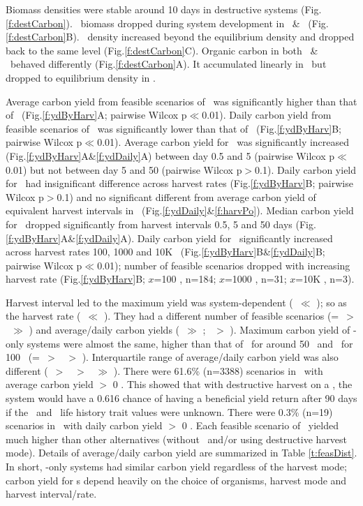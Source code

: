 \documentclass[../thesis.tex]{subfiles} %
\begin{document}
Biomass densities were stable around 10 days in destructive systems (Fig.\ref{f:destCarbon}).  \Phy\ biomass dropped during system development in \PoN\ \& \PBN\  (Fig.\ref{f:destCarbon}B).  \Bac\ density increased beyond the equilibrium density and dropped back to the same level (Fig.\ref{f:destCarbon}C).  Organic carbon in both \PoN\ \& \PBN\ behaved differently (Fig.\ref{f:destCarbon}A).  It accumulated linearly in \PoN\ but dropped to equilibrium density in \PBH.

Average carbon yield from feasible scenarios of \PoN\ was significantly higher than that of \PBN\ (Fig.\ref{f:ydByHarv}A; pairwise Wilcox p$\ll$0.01).  Daily carbon yield from feasible scenarios of \PoH\ was significantly lower than that of \PBH\ (Fig.\ref{f:ydByHarv}B; pairwise Wilcox p$\ll$0.01).  Average carbon yield for \PoN\ was significantly increased (Fig.\ref{f:ydByHarv}A\&\ref{f:ydDaily}A) between day 0.5 and 5 (pairwise Wilcox p$\ll$0.01) but not between day 5 and 50 (pairwise Wilcox p$>$0.1).  Daily carbon yield for \PoH\ had insignificant difference across harvest rates (Fig.\ref{f:ydByHarv}B; pairwise Wilcox p$>$0.1) and no significant different from average carbon yield of equivalent harvest intervals in \PoN\ (Fig.\ref{f:ydDaily}\&\ref{f:harvPo}).  Median carbon yield for \PBN\ dropped significantly from harvest intervals 0.5, 5 and 50 days (Fig.\ref{f:ydByHarv}A\&\ref{f:ydDaily}A).  Daily carbon yield for \PBH\ significantly increased across harvest rates 100, 1000 and 10K \dayU\ (Fig.\ref{f:ydByHarv}B\&\ref{f:ydDaily}B; pairwise Wilcox p$\ll$0.01); number of feasible scenarios dropped with increasing harvest rate (Fig.\ref{f:ydByHarv}B; $x$=100 \dayU, n=184; $x$=1000 \dayU, n=31; $x$=10K \dayU, n=3).

Harvest interval led to the maximum yield was system-dependent (\PBN\ $\ll$ \PoN); so as the harvest rate (\PBH\ $\ll$ \PoH).  They had a different number of feasible scenarios (\PoH=\PoN\ $>$ \PBN\ $\gg$ \PBH) and average/daily carbon yields (\PBH\ $\gg$ \PoH; \PoN\ $>$ \PBN).  Maximum carbon yield of \phy-only systems were almost the same, higher than that of \PBH\ for around 50 \dxdt\ and \PBN\ for 100 \dxdt\ (\PoH=\PoN\ $>$ \PBH\ $>$ \PBN).  Interquartile range of average/daily carbon yield was also different (\PBH\ $>$ \PoH\ $>$ \PoN\ $\gg$ \PBN).  There were 61.6\% (n=3388) scenarios in \PBN\ with average carbon yield $>$ 0 \dxdt.  This showed that with destructive harvest on a \pbs, the system would have a 0.616 chance of having a beneficial yield return after 90 days if the \phy\ and \bac\ life history trait values were unknown.  There were 0.3\% (n=19) scenarios in \PBH\ with daily carbon yield $>$ 0 \dxdt.  Each feasible scenario of \PBH\ yielded much higher than other alternatives (without \bac\ and/or using destructive harvest mode).  Details of average/daily carbon yield are summarized in Table \ref{t:feasDist}.  In short, \phy-only systems had similar carbon yield regardless of the harvest mode; carbon yield for \pbs s depend heavily on the choice of organisms, harvest mode and harvest interval/rate.
\end{document}
